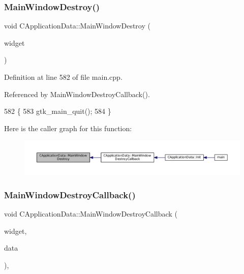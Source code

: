\subsubsection{\texorpdfstring{Main\+Window\+Destroy()}{MainWindowDestroy()}}
{\footnotesize\ttfamily void C\+Application\+Data\+::\+Main\+Window\+Destroy (\begin{DoxyParamCaption}\item[{Gtk\+Widget $\ast$}]{widget }\end{DoxyParamCaption})\hspace{0.3cm}{\ttfamily [protected]}}



Definition at line 582 of file main.\+cpp.



Referenced by Main\+Window\+Destroy\+Callback().


\begin{DoxyCode}
582                                                          \{
583     gtk\_main\_quit();
584 \}
\end{DoxyCode}
Here is the caller graph for this function\+:\nopagebreak
\begin{figure}[H]
\begin{center}
\leavevmode
\includegraphics[width=350pt]{classCApplicationData_a202437b2380956a5519722937cd9f96a_icgraph}
\end{center}
\end{figure}
\hypertarget{classCApplicationData_a379327c78dc57aa9dcef77e1b98efa2d}{}\label{classCApplicationData_a379327c78dc57aa9dcef77e1b98efa2d} 
\subsubsection{\texorpdfstring{Main\+Window\+Destroy\+Callback()}{MainWindowDestroyCallback()}}
{\footnotesize\ttfamily void C\+Application\+Data\+::\+Main\+Window\+Destroy\+Callback (\begin{DoxyParamCaption}\item[{Gtk\+Widget $\ast$}]{widget,  }\item[{gpointer}]{data }\end{DoxyParamCaption})\hspace{0.3cm}{\ttfamily [static]}, {\ttfamily [protected]}}



